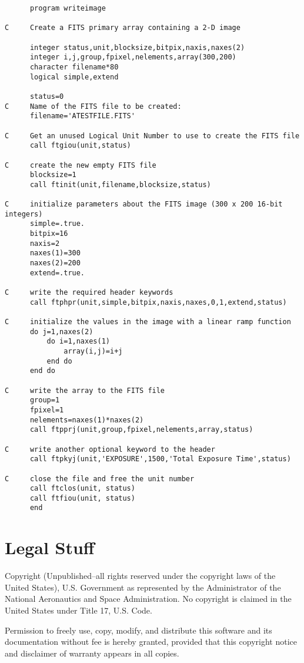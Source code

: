 \documentclass[11pt]{book}
\begin{document}
\begin{verbatim}
      program writeimage

C     Create a FITS primary array containing a 2-D image

      integer status,unit,blocksize,bitpix,naxis,naxes(2)
      integer i,j,group,fpixel,nelements,array(300,200)
      character filename*80
      logical simple,extend

      status=0
C     Name of the FITS file to be created:
      filename='ATESTFILE.FITS'

C     Get an unused Logical Unit Number to use to create the FITS file
      call ftgiou(unit,status)

C     create the new empty FITS file
      blocksize=1
      call ftinit(unit,filename,blocksize,status)

C     initialize parameters about the FITS image (300 x 200 16-bit integers)
      simple=.true.
      bitpix=16
      naxis=2
      naxes(1)=300
      naxes(2)=200
      extend=.true.

C     write the required header keywords
      call ftphpr(unit,simple,bitpix,naxis,naxes,0,1,extend,status)

C     initialize the values in the image with a linear ramp function
      do j=1,naxes(2)
          do i=1,naxes(1)
              array(i,j)=i+j
          end do
      end do

C     write the array to the FITS file
      group=1
      fpixel=1
      nelements=naxes(1)*naxes(2)
      call ftpprj(unit,group,fpixel,nelements,array,status)

C     write another optional keyword to the header
      call ftpkyj(unit,'EXPOSURE',1500,'Total Exposure Time',status)

C     close the file and free the unit number
      call ftclos(unit, status)
      call ftfiou(unit, status)
      end
\end{verbatim}


\section{Legal Stuff}

Copyright (Unpublished--all rights reserved under the copyright laws of
the United States), U.S. Government as represented by the Administrator
of the National Aeronautics and Space Administration.  No copyright is
claimed in the United States under Title 17, U.S. Code.

Permission to freely use, copy, modify, and distribute this software
and its documentation without fee is hereby granted, provided that this
copyright notice and disclaimer of warranty appears in all copies.
\end{document}
